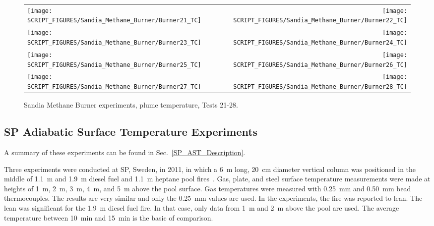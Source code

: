 \begin{figure}[p]
\begin{tabular*}{\textwidth}{l@{\extracolsep{\fill}}r}
\texttt{[image: SCRIPT\_FIGURES/Sandia\_Methane\_Burner/Burner21\_TC]} &
\texttt{[image: SCRIPT\_FIGURES/Sandia\_Methane\_Burner/Burner22\_TC]} \\
\texttt{[image: SCRIPT\_FIGURES/Sandia\_Methane\_Burner/Burner23\_TC]} &
\texttt{[image: SCRIPT\_FIGURES/Sandia\_Methane\_Burner/Burner24\_TC]} \\
\texttt{[image: SCRIPT\_FIGURES/Sandia\_Methane\_Burner/Burner25\_TC]} &
\texttt{[image: SCRIPT\_FIGURES/Sandia\_Methane\_Burner/Burner26\_TC]} \\
\texttt{[image: SCRIPT\_FIGURES/Sandia\_Methane\_Burner/Burner27\_TC]} &
\texttt{[image: SCRIPT\_FIGURES/Sandia\_Methane\_Burner/Burner28\_TC]}
\end{tabular*}
\caption[Sandia Methane Burner, plume temperature, Tests 21-28]{Sandia Methane Burner experiments, plume temperature, Tests 21-28.}
\label{Sandia_Methane_Burner_TC_4}
\end{figure}


\clearpage

\subsection{SP Adiabatic Surface Temperature Experiments}
\label{SP_AST_Plume_Temperature}

A summary of these experiments can be found in Sec.~\ref{SP_AST_Description}.

Three experiments were conducted at SP, Sweden, in 2011, in which a 6~m long, 20~cm diameter vertical column was positioned in the middle of 1.1~m and 1.9~m diesel fuel and 1.1~m heptane
pool fires~\cite{Sjostrom:AST}. Gas, plate, and steel surface temperature measurements were made at heights of 1~m, 2~m, 3~m, 4~m, and 5~m above the pool surface. Gas temperatures were measured with 0.25~mm and 0.50~mm bead thermocouples. The results are very similar and only the 0.25~mm values are used. In the experiments, the fire was reported to lean. The lean was significant for the 1.9~m diesel fuel fire. In that case, only data from 1~m and 2~m above the pool are used. The average temperature between 10~min and 15~min is the basic of comparison.


